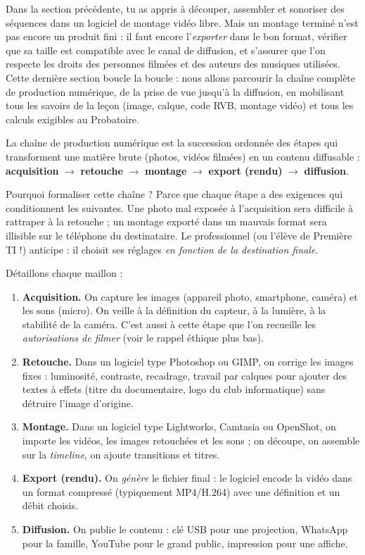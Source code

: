 \documentclass[11pt]{article}
\newcommand{\cle}[1]{{\popxbold\color{popdark}#1}}
\newcounter{popsec}
\newcounter{popsub}
\newcommand{\courssub}[1]{%
  \stepcounter{popsub}%
  \par\vspace{9pt}\noindent{\popxbold\fontsize{11.5}{13}\selectfont\color{popink}{\color{poporange}\thepopsec.\thepopsub}\hspace{6pt}#1}\par\nopagebreak\vspace{4pt}
}
\begin{document}
Dans la section précédente, tu as appris à découper, assembler et sonoriser des séquences dans un logiciel de montage vidéo libre. Mais un montage terminé n'est pas encore un produit fini : il faut encore l'\emph{exporter} dans le bon format, vérifier que sa taille est compatible avec le canal de diffusion, et s'assurer que l'on respecte les droits des personnes filmées et des auteurs des musiques utilisées. Cette dernière section boucle la boucle : nous allons parcourir la \cle{chaîne complète de production numérique}, de la prise de vue jusqu'à la diffusion, en mobilisant tous les savoirs de la leçon (image, calque, code RVB, montage vidéo) et tous les calculs exigibles au Probatoire.

\courssub{La chaîne complète de production numérique}

\begin{definition}
La \cle{chaîne de production numérique} est la succession ordonnée des étapes qui transforment une matière brute (photos, vidéos filmées) en un contenu diffusable : \textbf{acquisition} $\rightarrow$ \textbf{retouche} $\rightarrow$ \textbf{montage} $\rightarrow$ \textbf{export (rendu)} $\rightarrow$ \textbf{diffusion}.
\end{definition}

Pourquoi formaliser cette chaîne ? Parce que chaque étape a des exigences qui conditionnent les suivantes. Une photo mal exposée à l'acquisition sera difficile à rattraper à la retouche ; un montage exporté dans un mauvais format sera illisible sur le téléphone du destinataire. Le professionnel (ou l'élève de Première TI !) anticipe : il choisit ses réglages \emph{en fonction de la destination finale}.

Détaillons chaque maillon :

\begin{enumerate}
\item \textbf{Acquisition.} On capture les images (appareil photo, smartphone, caméra) et les sons (micro). On veille à la définition du capteur, à la lumière, à la stabilité de la caméra. C'est aussi à cette étape que l'on recueille les \emph{autorisations de filmer} (voir le rappel éthique plus bas).
\item \textbf{Retouche.} Dans un logiciel type Photoshop ou GIMP, on corrige les images fixes : luminosité, contraste, recadrage, travail par \cle{calques} pour ajouter des textes à effets (titre du documentaire, logo du club informatique) sans détruire l'image d'origine.
\item \textbf{Montage.} Dans un logiciel type Lightworks, Camtasia ou OpenShot, on importe les vidéos, les images retouchées et les sons ; on découpe, on assemble sur la \emph{timeline}, on ajoute transitions et titres.
\item \textbf{Export (rendu).} On \emph{génère} le fichier final : le logiciel encode la vidéo dans un format compressé (typiquement MP4/H.264) avec une définition et un débit choisis.
\item \textbf{Diffusion.} On publie le contenu : clé USB pour une projection, WhatsApp pour la famille, YouTube pour le grand public, impression pour une affiche.
\end{enumerate}
\end{document}
